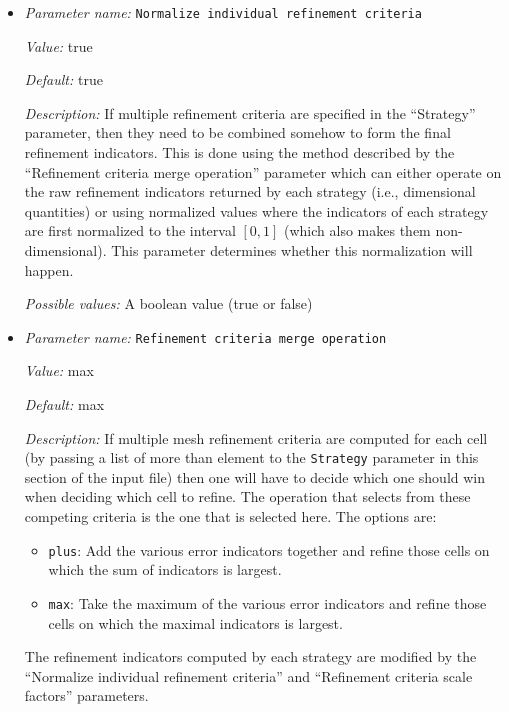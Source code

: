 \begin{itemize}
{\it Possible values:} An integer $n$ such that $0\leq n \leq 2147483647$
\item {\it Parameter name:} {\tt Normalize individual refinement criteria}
\label{parameters:Mesh refinement/Normalize individual refinement criteria}
\label{parameters:Mesh_20refinement/Normalize_20individual_20refinement_20criteria}


{\it Value:} true


{\it Default:} true


{\it Description:} If multiple refinement criteria are specified in the ``Strategy'' parameter, then they need to be combined somehow to form the final refinement indicators. This is done using the method described by the ``Refinement criteria merge operation'' parameter which can either operate on the raw refinement indicators returned by each strategy (i.e., dimensional quantities) or using normalized values where the indicators of each strategy are first normalized to the interval $[0,1]$ (which also makes them non-dimensional). This parameter determines whether this normalization will happen.


{\it Possible values:} A boolean value (true or false)
\item {\it Parameter name:} {\tt Refinement criteria merge operation}
\label{parameters:Mesh refinement/Refinement criteria merge operation}
\label{parameters:Mesh_20refinement/Refinement_20criteria_20merge_20operation}


{\it Value:} max


{\it Default:} max


{\it Description:} If multiple mesh refinement criteria are computed for each cell (by passing a list of more than element to the \texttt{Strategy} parameter in this section of the input file) then one will have to decide which one should win when deciding which cell to refine. The operation that selects from these competing criteria is the one that is selected here. The options are:

\begin{itemize}
\item \texttt{plus}: Add the various error indicators together and refine those cells on which the sum of indicators is largest.
\item \texttt{max}: Take the maximum of the various error indicators and refine those cells on which the maximal indicators is largest.
\end{itemize}The refinement indicators computed by each strategy are modified by the ``Normalize individual refinement criteria'' and ``Refinement criteria scale factors'' parameters.



\end{itemize}
